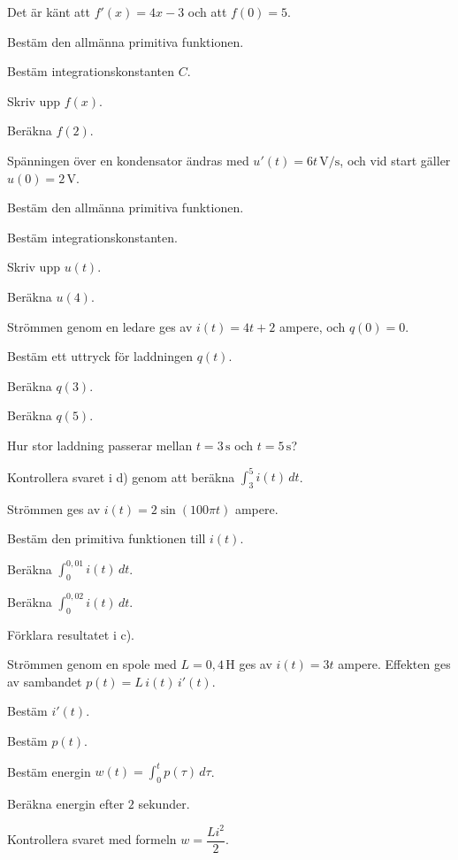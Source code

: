 Det är känt att $f'(x) = 4x - 3$ och att $f(0) = 5$.
\begin{parts}
  \item Bestäm den allmänna primitiva funktionen.
  \item Bestäm integrationskonstanten $C$.
  \item Skriv upp $f(x)$.
  \item Beräkna $f(2)$.
\end{parts}

Spänningen över en kondensator ändras med $u'(t) = 6t\,\text{V/s}$, och vid start gäller
$u(0) = 2\,\text{V}$.
\begin{parts}
  \item Bestäm den allmänna primitiva funktionen.
  \item Bestäm integrationskonstanten.
  \item Skriv upp $u(t)$.
  \item Beräkna $u(4)$.
\end{parts}

Strömmen genom en ledare ges av $i(t) = 4t + 2$ ampere, och $q(0) = 0$.
\begin{parts}
  \item Bestäm ett uttryck för laddningen $q(t)$.
  \item Beräkna $q(3)$.
  \item Beräkna $q(5)$.
  \item Hur stor laddning passerar mellan $t = 3\,\text{s}$ och $t = 5\,\text{s}$?
  \item Kontrollera svaret i d) genom att beräkna $\displaystyle\int_3^5 i(t)\,dt$.
\end{parts}

Strömmen ges av $i(t) = 2\sin(100\pi t)$ ampere.
\begin{parts}
  \item Bestäm den primitiva funktionen till $i(t)$.
  \item Beräkna $\displaystyle\int_0^{0{,}01} i(t)\,dt$.
  \item Beräkna $\displaystyle\int_0^{0{,}02} i(t)\,dt$.
  \item Förklara resultatet i c).
\end{parts}

Strömmen genom en spole med $L = 0{,}4\,\text{H}$ ges av $i(t) = 3t$ ampere. Effekten ges av
sambandet $p(t) = L\,i(t)\,i'(t)$.
\begin{parts}
  \item Bestäm $i'(t)$.
  \item Bestäm $p(t)$.
  \item Bestäm energin $w(t) = \displaystyle\int_0^t p(\tau)\,d\tau$.
  \item Beräkna energin efter $2$ sekunder.
  \item Kontrollera svaret med formeln $w = \dfrac{Li^2}{2}$.
\end{parts}

